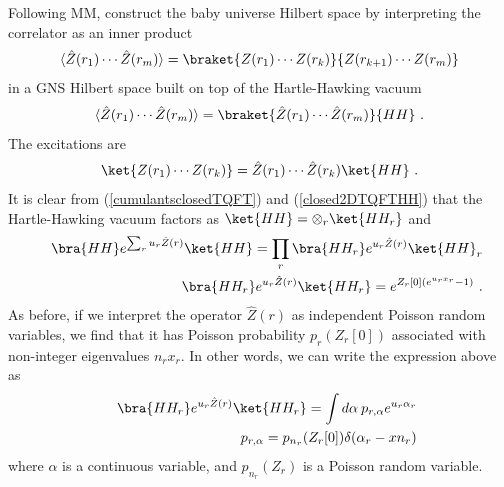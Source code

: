 \documentclass[a4paper,11pt]{article}
\theoremstyle{definition}
\numberwithin{equation}{section}
\newcommand{\nn}{\nonumber}
\begin{document}
Following MM, \cite{gardiner20212D,banerjee2022comments}  construct the baby universe Hilbert space by interpreting the correlator as an inner product 
\begin{eqnarray}
    \langle \hat{Z}(r_1)\cdots \hat{Z}(r_m)\rangle=\braket{Z(r_1)\cdots Z(r_k)}{Z(r_{k+1})\cdots Z(r_m)}
\end{eqnarray}
in a GNS Hilbert space built on top of the Hartle-Hawking vacuum
\begin{eqnarray}\label{closed2DTQFTHH}
    \langle \hat{Z}(r_1)\cdots \hat{Z}(r_m)\rangle=\braket{\hat{Z}(r_1)\cdots \hat{Z}(r_m)}{HH}\ .
\end{eqnarray}
The excitations are
\begin{eqnarray}
    \ket{Z(r_1)\cdots Z(r_k)}=\hat{Z}(r_1)\cdots \hat{Z}(r_k)\ket{HH}\ .
\end{eqnarray}
It is clear from (\ref{cumulantsclosedTQFT}) and (\ref{closed2DTQFTHH}) that the Hartle-Hawking vacuum factors as $\ket{HH}=\otimes_r \ket{HH_r}$ and
\begin{eqnarray}
    &&\bra{HH}e^{\sum_r u_r\hat{Z}(r)}\ket{HH}=\prod_r\bra{HH_r}e^{u_r\hat{Z}(r)}\ket{HH}_r\nn\\
    &&\bra{HH_r}e^{u_r\hat{Z}(r)}\ket{HH_r}=e^{Z_r[0](e^{u_rx_r}-1)}\ .
\end{eqnarray}
As before, if we interpret the operator $\hat{Z}(r)$ as independent Poisson random variables, we find that it has Poisson probability $p_r(Z_r[0])$ associated with non-integer eigenvalues $n_r x_r$. In other words, we can write the expression above as
\begin{eqnarray}
   &&\bra{HH_r}e^{u_r\hat{Z}(r)}\ket{HH_r}=\int d\alpha \: p_{r,\alpha} e^{u_r\alpha_r}\nn\\
   &&p_{r,\alpha}=p_{n_r}(Z_r[0])\delta(\alpha_r-x n_r)
\end{eqnarray}
where $\alpha$ is a continuous variable, and $p_{n_r}(Z_r)$ is a Poisson random variable. 
\end{document}
